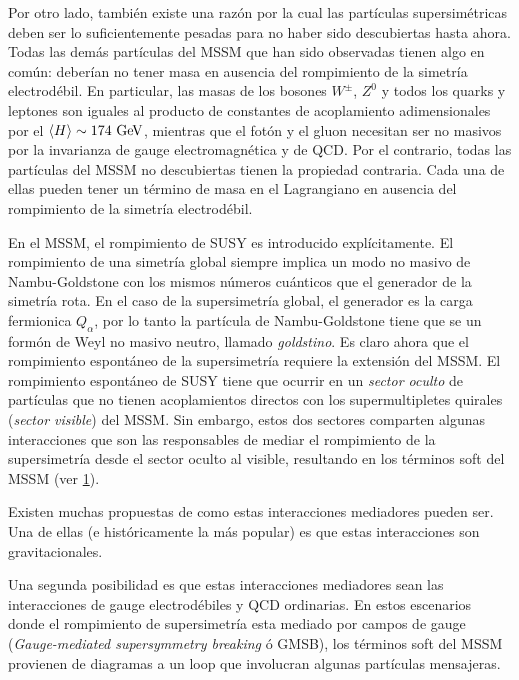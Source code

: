 Por otro lado, también existe una razón por la cual las partículas
supersimétricas deben ser lo suficientemente pesadas para no haber sido
descubiertas hasta ahora. Todas las demás partículas del MSSM que han sido
observadas tienen algo en común: deberían no tener masa en ausencia del
rompimiento de la simetría electrodébil. En particular, las masas de los
bosones $W^\pm$, $Z^0$ y todos los quarks y leptones son iguales al producto de
constantes de acoplamiento adimensionales por el $\avg{H} \sim 174 \gev$,
mientras que el fotón y el gluon necesitan ser no masivos por la invarianza de
gauge electromagnética y de QCD. Por el contrario, todas las partículas del MSSM
no descubiertas tienen la propiedad contraria. Cada una de ellas pueden tener un
término de masa en el Lagrangiano en ausencia del rompimiento de la simetría
electrodébil.

En el MSSM, el rompimiento de SUSY es introducido explícitamente. El rompimiento
de una simetría global siempre implica un modo no masivo de Nambu-Goldstone con
los mismos números cuánticos que el generador de la simetría rota. En el caso de
la supersimetría global, el generador es la carga fermionica $Q_\alpha$, por lo
tanto la partícula de Nambu-Goldstone tiene que se un formón de Weyl no masivo
neutro, llamado \emph{goldstino}. Es claro ahora que el rompimiento espontáneo
de la supersimetría requiere la extensión del MSSM. El rompimiento espontáneo de
SUSY tiene que ocurrir en un \emph{sector oculto} de partículas que no tienen
acoplamientos directos con los supermultipletes quirales (\emph{sector visible})
del MSSM. Sin embargo, estos dos sectores comparten algunas interacciones que
son las responsables de mediar el rompimiento de la supersimetría desde el
sector oculto al visible, resultando en los términos soft del MSSM (ver
\cref{fig:susy_breaking}).

\begin{figure}[!htbp]
  \centering
  
  \caption{}\label{fig:susy_breaking}
\end{figure}

Existen muchas propuestas de como estas interacciones mediadores pueden ser. Una
de ellas (e históricamente la más popular) es que estas interacciones son
gravitacionales.

Una segunda posibilidad es que estas interacciones mediadores sean las
interacciones de gauge electrodébiles y QCD ordinarias. En estos escenarios
donde el rompimiento de supersimetría esta mediado por campos de gauge
(\emph{Gauge-mediated supersymmetry breaking} ó GMSB), los términos soft del
MSSM provienen de diagramas a un loop que involucran algunas partículas
mensajeras.

